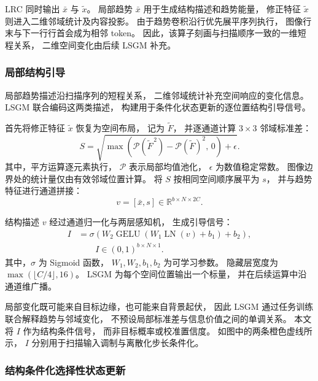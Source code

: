 \documentclass[journal]{IEEEtran}
\begin{document}
LRC 同时输出 $\bar{x}$ 与 $\tilde{x}$。
局部趋势 $\bar{x}$ 用于生成结构描述和趋势能量，
修正特征 $\tilde{x}$ 则进入二维邻域统计及内容投影。
由于趋势卷积沿行优先展平序列执行，
图像行末与下一行行首会成为相邻 token。
因此，该算子刻画与扫描顺序一致的一维短程关系，
二维空间变化由后续 LSGM 补充。


\subsubsection{局部结构引导}
\label{sec:lsgm}

局部趋势描述沿扫描序列的短程关系，
二维邻域统计补充空间响应的变化信息。
LSGM 联合编码这两类描述，
构建用于条件化状态更新的逐位置结构引导信号。

首先将修正特征 $\tilde{x}$ 恢复为空间布局，
记为 $\widetilde{F}$，
并逐通道计算 $3\times3$ 邻域标准差：
\begin{equation}
S=
\sqrt{
\max\left(
\mathcal{P}(\widetilde{F}^{\,2})
-
\mathcal{P}(\widetilde{F})^{2},
\,0
\right)
+\epsilon
}.
\label{eq:local_std}
\end{equation}
其中，平方运算逐元素执行，
$\mathcal{P}$ 表示局部均值池化，
$\epsilon$ 为数值稳定常数。
图像边界处的统计量仅由有效邻域位置计算。
将 $S$ 按相同空间顺序展平为 $s$，
并与趋势特征进行通道拼接：
\begin{equation}
v=[\bar{x},s]
\in\mathbb{R}^{b\times N\times2C}.
\label{eq:structural_descriptor}
\end{equation}

结构描述 $v$ 经过通道归一化与两层感知机，
生成引导信号：
\begin{equation}
\begin{aligned}
I&=\sigma\left(
W_2\operatorname{GELU}
\left(W_1\operatorname{LN}(v)+b_1\right)+b_2
\right),\\
&\qquad I\in(0,1)^{b\times N\times1}.
\end{aligned}
\label{eq:importance}
\end{equation}
其中，$\sigma$ 为 Sigmoid 函数，
$W_1,W_2,b_1,b_2$ 为可学习参数。
隐藏层宽度为
$\max(\lfloor C/4\rfloor,16)$。
LSGM 为每个空间位置输出一个标量，
并在后续运算中沿通道维广播。

局部变化既可能来自目标边缘，也可能来自背景起伏，
因此 LSGM 通过任务训练联合解释趋势与邻域变化，
不预设局部标准差与信息价值之间的单调关系。
本文将 $I$ 作为结构条件信号，
而非目标概率或校准置信度。
如图中的两条橙色虚线所示，
$I$ 分别用于扫描输入调制与离散化步长条件化。


\subsubsection{结构条件化选择性状态更新}
\label{sec:structure_conditioned_ssm}
\end{document}
